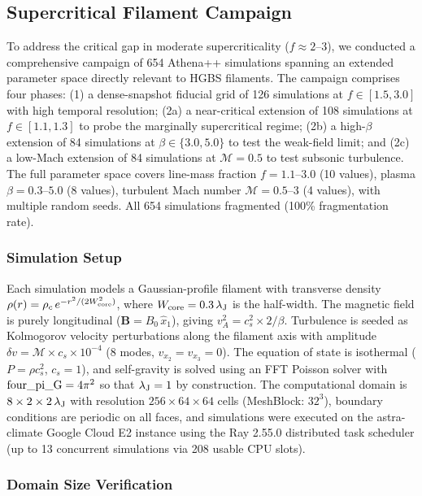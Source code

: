 \documentclass[twoside,twocolumn]{mnras}
\begin{document}
\subsection{Supercritical Filament Campaign}
\label{sec:supercrit}

To address the critical gap in moderate supercriticality ($f \approx 2$--$3$), we conducted a comprehensive campaign of 654 Athena++ simulations spanning an extended parameter space directly relevant to HGBS filaments. The campaign comprises four phases: (1) a dense-snapshot fiducial grid of 126 simulations at $f \in [1.5, 3.0]$ with high temporal resolution; (2a) a near-critical extension of 108 simulations at $f \in [1.1, 1.3]$ to probe the marginally supercritical regime; (2b) a high-$\beta$ extension of 84 simulations at $\beta \in \{3.0, 5.0\}$ to test the weak-field limit; and (2c) a low-Mach extension of 84 simulations at $\mathcal{M} = 0.5$ to test subsonic turbulence. The full parameter space covers line-mass fraction $f = 1.1$--$3.0$ (10 values), plasma $\beta = 0.3$--$5.0$ (8 values), turbulent Mach number $\mathcal{M} = 0.5$--$3$ (4 values), with multiple random seeds. All 654 simulations fragmented (100\% fragmentation rate).

\subsubsection{Simulation Setup}

Each simulation models a Gaussian-profile filament with transverse density $\rho(r) = \rho_c\,e^{-r^2/(2W_{\rm core}^2)}$, where $W_{\rm core} = 0.3\,\lambda_{\rm J}$ is the half-width. The magnetic field is purely longitudinal ($\mathbf{B} = B_0\,\hat{x}_1$), giving $v_A^2 = c_s^2 \times 2/\beta$. Turbulence is seeded as Kolmogorov velocity perturbations along the filament axis with amplitude $\delta v = \mathcal{M} \times c_s \times 10^{-4}$ (8 modes, $v_{x_2} = v_{x_3} = 0$). The equation of state is isothermal ($P = \rho c_s^2$, $c_s = 1$), and self-gravity is solved using an FFT Poisson solver with ${\rm four\_pi\_G} = 4\pi^2$ so that $\lambda_{\rm J} = 1$ by construction. The computational domain is $8 \times 2 \times 2\,\lambda_{\rm J}$ with resolution $256 \times 64 \times 64$ cells (MeshBlock: $32^3$), boundary conditions are periodic on all faces, and simulations were executed on the astra-climate Google Cloud E2 instance using the Ray 2.55.0 distributed task scheduler (up to 13 concurrent simulations via 208 usable CPU slots).

\subsubsection{Domain Size Verification}
\end{document}
